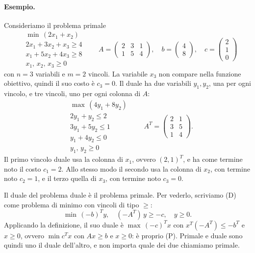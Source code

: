 \paragraph{Esempio.}
Consideriamo il problema primale
\[
\begin{aligned}
&\min\, (2x_1 + x_2) \\
&2x_1 + 3x_2 + x_3 \ge 4 \\
&x_1 + 5x_2 + 4x_3 \ge 8 \\
&x_1,\, x_2,\, x_3 \ge 0
\end{aligned}
\qquad
A = \begin{pmatrix} 2 & 3 & 1 \\ 1 & 5 & 4 \end{pmatrix}, \quad
b = \begin{pmatrix} 4 \\ 8 \end{pmatrix}, \quad
c = \begin{pmatrix} 2 \\ 1 \\ 0 \end{pmatrix}
\]
con $n = 3$ variabili e $m = 2$ vincoli. La variabile $x_3$ non compare nella funzione obiettivo, quindi il suo costo è $c_3 = 0$. Il duale ha due variabili $y_1, y_2$, una per ogni vincolo, e tre vincoli, uno per ogni colonna di $A$:
\[
\begin{aligned}
&\max\, (4y_1 + 8y_2) \\
&2y_1 + y_2 \le 2 \\
&3y_1 + 5y_2 \le 1 \\
&y_1 + 4y_2 \le 0 \\
&y_1,\, y_2 \ge 0
\end{aligned}
\qquad
A^T = \begin{pmatrix} 2 & 1 \\ 3 & 5 \\ 1 & 4 \end{pmatrix}.
\]
Il primo vincolo duale usa la colonna di $x_1$, ovvero $(2, 1)^T$, e ha come termine noto il costo $c_1 = 2$. Allo stesso modo il secondo usa la colonna di $x_2$, con termine noto $c_2 = 1$, e il terzo quella di $x_3$, con termine noto $c_3 = 0$.

\begin{osservazione}
Il duale del problema duale è il problema primale. Per vederlo, scriviamo (D) come problema di minimo con vincoli di tipo $\ge$:
\[
\min\, (-b)^T y, \quad (-A^T)\, y \ge -c, \quad y \ge 0.
\]
Applicando la definizione, il suo duale è $\max\, (-c)^T x$ con $x^T(-A^T) \le -b^T$ e $x \ge 0$, ovvero $\min c^T x$ con $A x \ge b$ e $x \ge 0$: è proprio (P). Primale e duale sono quindi uno il duale dell'altro, e non importa quale dei due chiamiamo primale.
\end{osservazione}


